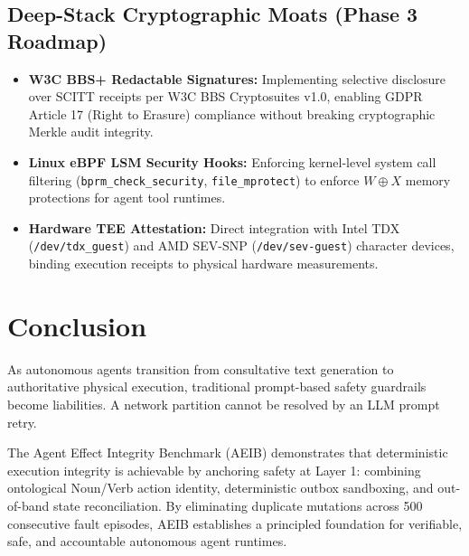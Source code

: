 \documentclass[10pt,journal,compsoc]{IEEEtran}
\begin{document}
\subsection{Deep-Stack Cryptographic Moats (Phase 3 Roadmap)}
\begin{itemize}
    \item \textbf{W3C BBS+ Redactable Signatures:} Implementing selective disclosure over SCITT receipts per W3C BBS Cryptosuites v1.0, enabling GDPR Article 17 (Right to Erasure) compliance without breaking cryptographic Merkle audit integrity.
    \item \textbf{Linux eBPF LSM Security Hooks:} Enforcing kernel-level system call filtering (\texttt{bprm\_check\_security}, \texttt{file\_mprotect}) to enforce $W \oplus X$ memory protections for agent tool runtimes.
    \item \textbf{Hardware TEE Attestation:} Direct integration with Intel TDX (\texttt{/dev/tdx\_guest}) and AMD SEV-SNP (\texttt{/dev/sev-guest}) character devices, binding execution receipts to physical hardware measurements.
\end{itemize}

\section{Conclusion}
As autonomous agents transition from consultative text generation to authoritative physical execution, traditional prompt-based safety guardrails become liabilities. A network partition cannot be resolved by an LLM prompt retry.

The Agent Effect Integrity Benchmark (AEIB) demonstrates that deterministic execution integrity is achievable by anchoring safety at Layer 1: combining ontological Noun/Verb action identity, deterministic outbox sandboxing, and out-of-band state reconciliation. By eliminating duplicate mutations across 500 consecutive fault episodes, AEIB establishes a principled foundation for verifiable, safe, and accountable autonomous agent runtimes.
\end{document}
